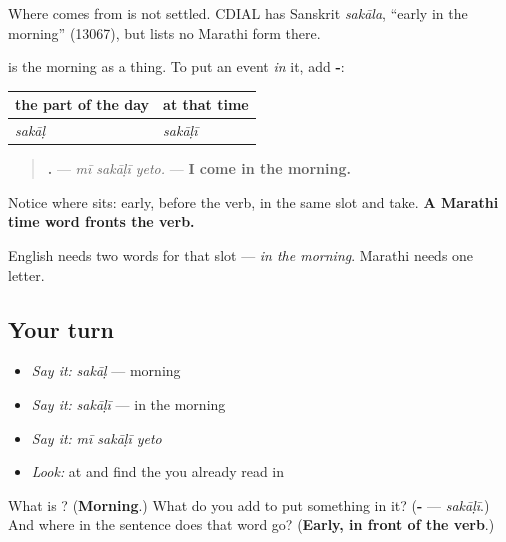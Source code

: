 Where \textbf{} comes from is not settled. CDIAL has Sanskrit \emph{sakāla}, \textquotedblleft{}early in the morning\textquotedblright{} (13067), but lists no Marathi form there.

\begin{grammarlens}[title={Grammar Lens: the ending that means \textquotedblleft{}at that time\textquotedblright{}}]
\textbf{} is the morning as a thing. To put an event \emph{in} it, add \textbf{-}:

\noindent
\begin{tabularx}{\linewidth}{@{}>{\raggedright\arraybackslash}X>{\raggedright\arraybackslash}X@{}}
\toprule
\textbf{the part of the day} & \textbf{at that time} \\
\midrule
\textbf{\mr{सकाळ}} \emph{sakāḷ} & \textbf{\mr{सकाळी}} \emph{sakāḷī} \\
\bottomrule
\end{tabularx}

\begin{quote}
\textbf{  .} — \emph{mī sakāḷī yeto.} — \textbf{I come in the morning.}
\end{quote}

Notice where \textbf{} sits: early, before the verb, in the same slot \textbf{} and \textbf{} take. \textbf{A Marathi time word fronts the verb.}

English needs two words for that slot — \emph{in the morning}. Marathi needs one letter.
\end{grammarlens}

\subsection*{Your turn}
\begin{itemize}
\raggedright
  \item \emph{Say it:} \emph{sakāḷ} — morning
  \item \emph{Say it:} \emph{sakāḷī} — in the morning
  \item \emph{Say it:} \emph{mī sakāḷī yeto}
  \item \emph{Look:} at \textbf{} and find the \textbf{} you already read in \textbf{}
\end{itemize}

\begin{tcolorbox}[breakable,colback=teal!4,colframe=teal!35!black,title={Before you move on}]
What is \textbf{}? (\textbf{Morning}.) What do you add to put something in it? (\textbf{-} — \emph{sakāḷī}.) And where in the sentence does that word go? (\textbf{Early, in front of the verb}.)
\end{tcolorbox}
